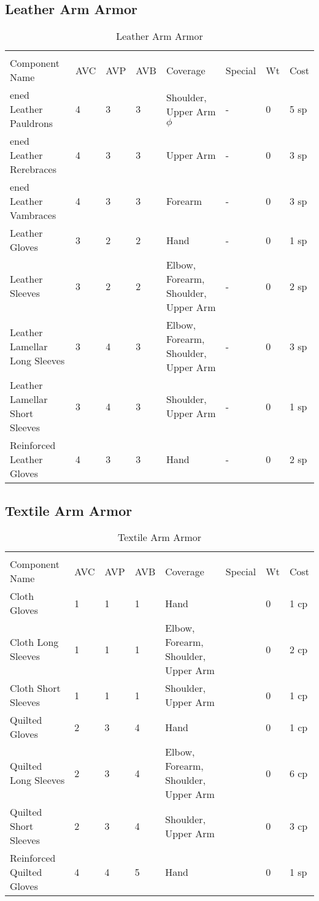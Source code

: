 \documentclass[oneside,11pt,english]{book}
\begin{document}
\subsection{Leather Arm Armor}
\begin{longtabu}to 
	\captionsetup{textformat=empty, labelformat=blank}
	\caption{Leather Arm Armor} \vspace{-15pt}
	\label{tab:Leather Arm Armor}\\
Component Name&AVC&AVP&AVB& Coverage& Special& Wt&Cost\\\toprule
{}ened Leather Pauldrons& 4& 3& 3& Shoulder, Upper Arm\hyperref[sec:Weak Spots]{$\phi$} &-& 0& 5 sp\\
ened Leather Rerebraces& 4& 3& 3& Upper Arm &-& 0& 3 sp\\
ened Leather Vambraces& 4& 3& 3& Forearm &-& 0& 3 sp\\
Leather Gloves& 3& 2& 2& Hand &-& 0& 1 sp\\
Leather Sleeves& 3& 2& 2& Elbow, Forearm, Shoulder, Upper Arm &-& 0& 2 sp\\
Leather Lamellar Long Sleeves& 3& 4& 3& Elbow, Forearm, Shoulder, Upper Arm &-& 0& 3 sp\\
Leather Lamellar Short Sleeves& 3& 4& 3& Shoulder, Upper Arm &-& 0& 1 sp\\
Reinforced Leather Gloves& 4& 3& 3& Hand &-& 0& 2 sp\\
\end{longtabu}
\subsection{Textile Arm Armor}
\begin{longtabu} to 
	\captionsetup{textformat=empty, labelformat=blank}
	\caption{Textile Arm Armor} \vspace{-15pt}
	\label{tab:Textile Arm Armor}\\
Component Name&AVC&AVP&AVB& Coverage& Special& Wt&Cost\\\toprule
Cloth Gloves& 1& 1& 1& Hand& & 0& 1 cp\\
Cloth Long Sleeves& 1& 1& 1& Elbow, Forearm, Shoulder, Upper Arm& & 0& 2 cp\\
Cloth Short Sleeves& 1& 1& 1& Shoulder, Upper Arm& & 0& 1 cp\\
Quilted Gloves& 2& 3& 4& Hand& & 0& 1 cp\\
Quilted Long Sleeves& 2& 3& 4& Elbow, Forearm, Shoulder, Upper Arm& & 0& 6 cp\\
Quilted Short Sleeves& 2& 3& 4& Shoulder, Upper Arm& & 0& 3 cp\\
Reinforced Quilted Gloves& 4& 4& 5& Hand& & 0& 1 sp\\
\end{longtabu}
\end{document}
